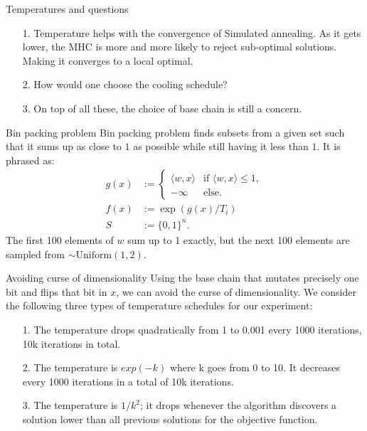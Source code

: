 \documentclass[11pt]{beamer}
\begin{document}
    \begin{frame}{Temperatures and questions}
        \begin{itemize}
            \item [1.] Temperature helps with the convergence of Simulated annealing. As it gets lower, the MHC is more and more likely to reject sub-optimal solutions. Making it converges to a local optimal. 
            \item [2.] How would one choose the cooling schedule? 
            \item [3.] On top of all these, the choice of base chain is still a concern. 
        \end{itemize}
    \end{frame}
    \begin{frame}{Bin packing problem}
        Bin packing problem finds subsets from a given set such that it sums up as close to $1$ as possible while still having it less than $1$. It is phrased as: 
        \begin{align*}
            g(x) &:= \begin{cases}
                \langle w, x\rangle & \text{if }\langle w, x\rangle\le 1,
                \\
                -\infty & \text{else}. 
            \end{cases}
            \\
            f(x) &:= \exp(g(x)/T_i)
            \\
            S &:= \{0, 1\}^n. 
        \end{align*}
        The first 100 elements of $w$ sum up to 1 exactly, but the next 100 elements are sampled from $\sim \text{Uniform}(1, 2)$. 
    \end{frame}
    \begin{frame}{Avoiding curse of dimensionality}
        Using the base chain that mutates precisely one bit and flips that bit in $x$, we can avoid the curse of dimensionality. We consider the following three types of temperature schedules for our experiment: 
        \begin{itemize}
            \item [1.] The temperature drops quadratically from 1 to 0.001 every 1000 iterations, 10k iterations in total. 
            \item [2.] The temperature is $exp(-k)$ where k goes from 0 to 10. It decreases every 1000 iterations in a total of 10k iterations. 
            \item [3.] The temperature is $1/k^2$; it drops whenever the algorithm discovers a solution lower than all previous solutions for the objective function.
        \end{itemize}
    \end{frame}
\end{document}
